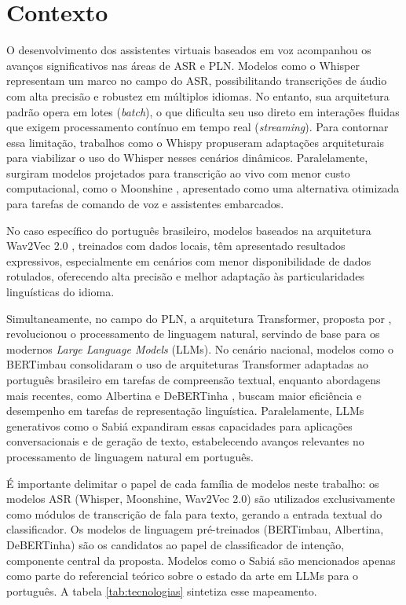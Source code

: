 \documentclass[
    12pt,                %
    openright,           %
    oneside,             %
    a4paper,             %
    english,             %
    brazil               %
]{abntex2}
\begin{document}
\section{Contexto}
\label{sec:contexto}

O desenvolvimento dos assistentes virtuais baseados em voz acompanhou os avanços significativos nas áreas de ASR e PLN. Modelos como o Whisper \cite{Radford2023} representam um marco no campo do ASR, possibilitando transcrições de áudio com alta precisão e robustez em múltiplos idiomas. No entanto, sua arquitetura padrão opera em lotes (\textit{batch}), o que dificulta seu uso direto em interações fluidas que exigem processamento contínuo em tempo real (\textit{streaming}). Para contornar essa limitação, trabalhos como o Whispy \cite{Bevilacqua2024} propuseram adaptações arquiteturais para viabilizar o uso do Whisper nesses cenários dinâmicos. Paralelamente, surgiram modelos projetados para transcrição ao vivo com menor custo computacional, como o Moonshine \cite{Jeffries2024}, apresentado como uma alternativa otimizada para tarefas de comando de voz e assistentes embarcados.

No caso específico do português brasileiro, modelos baseados na arquitetura Wav2Vec 2.0 \cite{Grosman2021}, treinados com dados locais, têm apresentado resultados expressivos, especialmente em cenários com menor disponibilidade de dados rotulados, oferecendo alta precisão e melhor adaptação às particularidades linguísticas do idioma.

Simultaneamente, no campo do PLN, a arquitetura Transformer, proposta por , revolucionou o processamento de linguagem natural, servindo de base para os modernos \textit{Large Language Models} (LLMs). No cenário nacional, modelos como o BERTimbau \cite{Souza2020} consolidaram o uso de arquiteturas Transformer adaptadas ao português brasileiro em tarefas de compreensão textual, enquanto abordagens mais recentes, como Albertina \cite{Rodrigues2023} e DeBERTinha \cite{Abonizio2023}, buscam maior eficiência e desempenho em tarefas de representação linguística. Paralelamente, LLMs generativos como o Sabiá \cite{Pires2023} expandiram essas capacidades para aplicações conversacionais e de geração de texto, estabelecendo avanços relevantes no processamento de linguagem natural em português.

É importante delimitar o papel de cada família de modelos neste trabalho: os modelos ASR (Whisper, Moonshine, Wav2Vec 2.0) são utilizados exclusivamente como módulos de transcrição de fala para texto, gerando a entrada textual do classificador. Os modelos de linguagem pré-treinados (BERTimbau, Albertina, DeBERTinha) são os candidatos ao papel de classificador de intenção, componente central da proposta. Modelos como o Sabiá são mencionados apenas como parte do referencial teórico sobre o estado da arte em LLMs para o português. A tabela \ref{tab:tecnologias} sintetiza esse mapeamento.
\end{document}
